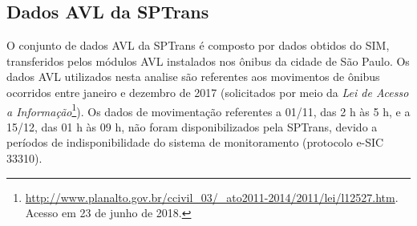 \documentclass[
	12pt,				%
	oneside,			%
	a4paper,			%
	english,			%
	brazil				%
	]{abntex2ppgsi}
\begin{document}
{{{\subsection{Dados AVL da SPTrans}

O conjunto de dados AVL da SPTrans é composto por dados obtidos do SIM, transferidos pelos módulos AVL instalados nos ônibus da cidade de São Paulo. Os dados AVL utilizados nesta analise são referentes aos movimentos de ônibus ocorridos entre janeiro e dezembro de 2017 (solicitados por meio da \textit{Lei de Acesso a Informação}\footnote{\url{http://www.planalto.gov.br/ccivil\_03/\_ato2011-2014/2011/lei/l12527.htm}. Acesso em 23 de junho de 2018.}). Os dados de movimentação referentes a 01/11, das 2 h às 5 h, e a 15/12, das 01 h às 09 h, não foram disponibilizados pela SPTrans,  devido a períodos de indisponibilidade do sistema de monitoramento (protocolo e-SIC 33310).

}}}
\end{document}
